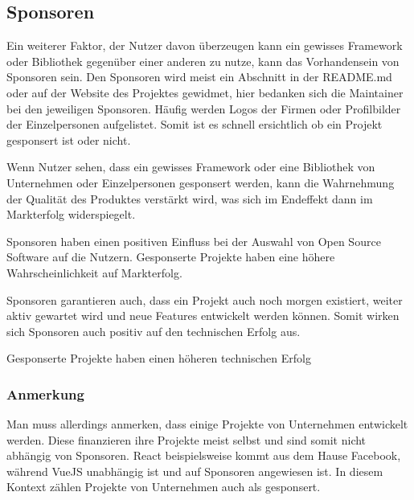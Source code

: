 \subsection{Sponsoren}




Ein weiterer Faktor, der Nutzer davon überzeugen kann ein gewisses Framework oder Bibliothek 
gegenüber einer anderen zu nutze, kann das Vorhandensein von Sponsoren sein. 
Den Sponsoren wird meist ein Abschnitt in der README.md oder auf der Website des Projektes
gewidmet, hier bedanken sich die Maintainer bei den jeweiligen Sponsoren. Häufig werden Logos
der Firmen oder Profilbilder der Einzelpersonen aufgelistet. Somit ist es schnell ersichtlich
ob ein Projekt gesponsert ist oder nicht. 

Wenn Nutzer sehen, dass ein gewisses Framework oder eine Bibliothek von Unternehmen oder 
Einzelpersonen gesponsert werden, kann die Wahrnehmung der Qualität 
des Produktes verstärkt wird, was sich im Endeffekt dann im Markterfolg widerspiegelt. %

\begin{hypothesis}
    Sponsoren haben einen positiven Einfluss bei der Auswahl von Open Source Software auf die Nutzern. Gesponserte Projekte haben
    eine höhere Wahrscheinlichkeit auf Markterfolg.
\end{hypothesis}

Sponsoren garantieren auch, dass ein Projekt auch noch morgen existiert, weiter aktiv gewartet wird
und neue Features entwickelt werden können. Somit wirken sich Sponsoren auch positiv auf den 
technischen Erfolg aus.

\begin{hypothesis}
    Gesponserte Projekte haben einen höheren technischen Erfolg
\end{hypothesis}

\subsubsection*{Anmerkung}
Man muss allerdings anmerken, dass einige Projekte von Unternehmen entwickelt werden. Diese finanzieren 
ihre Projekte meist selbst und sind somit nicht abhängig von Sponsoren. 
React beispielsweise kommt aus dem Hause Facebook, während VueJS unabhängig ist und auf Sponsoren angewiesen ist.
In diesem Kontext zählen Projekte von Unternehmen auch als gesponsert.